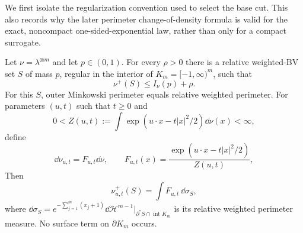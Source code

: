 \documentclass[../main.tex]{subfiles}
\begin{document}
We first isolate the regularization convention used to select the base cut.  This also records
why the later perimeter change-of-density formula is valid for the exact, noncompact
one-sided-exponential law, rather than only for a compact surrogate.

\begin{lemma}
\label{lem:sol-spectator-regularization}
Let $\nu=\lambda^{\otimes m}$ and let $p\in(0,1)$.  For every $\rho>0$ there is a relative
weighted-BV set $S$ of mass $p$, regular in the interior of
$K_m=[-1,\infty)^m$, such that
\[
  \nu^+(S)\le I_\nu(p)+\rho.
\]
For this $S$, outer Minkowski perimeter equals relative weighted perimeter.  For parameters
$(u,t)$ such that $t\ge0$ and
\[
  0<Z(u,t):=\int\exp(u\cdot x-t|x|^2/2)\dd\nu(x)<\infty,
\]
define
\[
  \dd\nu_{u,t}=F_{u,t}\dd\nu,
  \qquad
  F_{u,t}(x)=\frac{\exp(u\cdot x-t|x|^2/2)}{Z(u,t)},
\]
Then
\begin{equation}
  \nu_{u,t}^+(S)=\int F_{u,t}\,\dd\sigma_S,
  \label{eq:sol-spectator-density-change}
\end{equation}
where
$\dd\sigma_S=e^{-\sum_{j=1}^m(x_j+1)}
\dd\mathcal H^{m-1}|_{\partial^*S\cap\operatorname{int}K_m}$ is its relative weighted
perimeter measure.  No surface term on $\partial K_m$ occurs.
\end{lemma}
\end{document}
